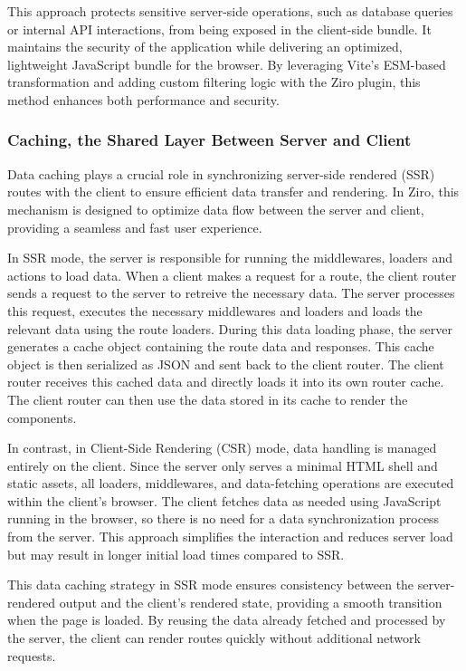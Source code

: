 This approach protects sensitive server-side operations, such as database queries or internal API interactions, from being exposed in the client-side bundle. It maintains the security of the application while delivering an optimized, lightweight JavaScript bundle for the browser. By leveraging Vite's ESM-based transformation and adding custom filtering logic with the Ziro plugin, this method enhances both performance and security.


\subsubsection{Caching, the Shared Layer Between Server and Client}

Data caching plays a crucial role in synchronizing server-side rendered (SSR) routes with the client to ensure efficient data transfer and rendering. In Ziro, this mechanism is designed to optimize data flow between the server and client, providing a seamless and fast user experience.

In SSR mode, the server is responsible for running the middlewares, loaders and actions to load data. When a client makes a request for a route, the client router sends a request to the server to retreive the necessary data. The server processes this request, executes the necessary middlewares and loaders and loads the relevant data using the route loaders. During this data loading phase, the server generates a cache object containing the route data and responses. This cache object is then serialized as JSON and sent back to the client router. The client router receives this cached data and directly loads it into its own router cache. The client router can then use the data stored in its cache to render the components.

In contrast, in Client-Side Rendering (CSR) mode, data handling is managed entirely on the client. Since the server only serves a minimal HTML shell and static assets, all loaders, middlewares, and data-fetching operations are executed within the client's browser. The client fetches data as needed using JavaScript running in the browser, so there is no need for a data synchronization process from the server. This approach simplifies the interaction and reduces server load but may result in longer initial load times compared to SSR.

This data caching strategy in SSR mode ensures consistency between the server-rendered output and the client's rendered state, providing a smooth transition when the page is loaded. By reusing the data already fetched and processed by the server, the client can render routes quickly without additional network requests.


